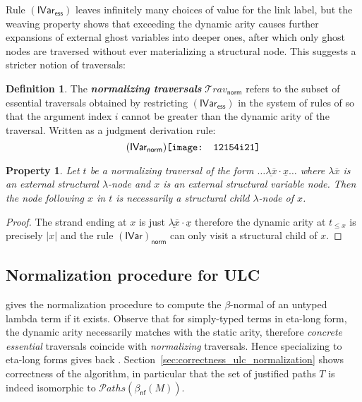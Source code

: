 \documentclass[xchauthor,chkrefs,GCNS,amsmath,amsthm,rotating,leaveRGB]{tcsg}
\renewcommand{\index}[1]{}
\theoremstyle{plain}
\newtheorem{property}[theorem]{Property}
\theoremstyle{definition}
\newtheorem{definition}{Definition}[section]
\newcommand\travset{\mathcal{T}\!rav}
\newcommand{\normalizing}{\mathsf{norm}}
\newcommand{\essential}{\mathsf{ess}}
\newcommand{\travsetnorm}{\travset_{\normalizing}}
\newcommand{\rulefont}[1]{\mathbf{\mathsf{#1}}}
\newcommand{\pathset}{{\mathcal{P}aths}}
\begin{document}
Rule $\mathbf {(\mathsf{IVar_{\essential}  })}$ leaves infinitely many
choices of value for the link label, but the weaving property shows that
exceeding the dynamic arity causes further expansions of external ghost
variables into deeper ones, after which only ghost nodes are traversed
without ever materializing a structural node. This suggests a stricter notion
of traversals:

\begin{definition}\label{def:normalizing_traversals}
The \textbf{\emph{normalizing traversals}}\index{normalizing traversals}
$\travsetnorm $ refers to the subset of essential traversals obtained by
restricting $\mathsf{(IVar_{\essential}  )}$ in the system of rules of
 so that the argument
index $i$ cannot be greater than the dynamic arity of the traversal. Written
as a judgment derivation rule:
%
\begin{equation}
\tag{$\rulefont{IVar_{\normalizing} }$}
\texttt{[image: 12154i21]}
\end{equation}
\end{definition}

\begin{property}\label{prop:strand_spinaldescent}
Let $t$ be a normalizing traversal of the form $\ldots \underline{\lambda
\overline{x}} \cdot \underline{x} \ldots $ where $\lambda \overline{x}$ is an
external structural $\lambda $-node and $x$ is an external structural
variable node. Then the node following $x$ in $t$ is necessarily a structural
child $\lambda $-node of $x$.
\end{property}

\begin{proof}
The strand ending at $x$ is just $\underline{\lambda \overline{x}} \cdot
\underline{x}$ therefore the dynamic arity at $t_{\leq x}$ is precisely $|x|$
and the rule $\mathbf {(\mathsf{IVar})}_{\normalizing} $ can only visit a
structural child of $x$.
\end{proof}


\subsection{Normalization procedure for ULC}\label{sec4.4}

 gives the
normalization procedure to compute the $\beta $-normal of an untyped lambda
term if it exists. Observe that for simply-typed terms in eta-long form, the
dynamic arity necessarily matches with the static arity, therefore
\emph{concrete essential} traversals coincide with \emph{normalizing}
traversals. Hence specializing
 to eta-long
forms gives back
.
Section~\ref{sec:correctness_ulc_normalization} shows correctness of the
algorithm, in particular that the set of justified paths $T$ is indeed
isomorphic to $\pathset (\beta _{\mathsf{nf}}(M))$.
\end{document}
